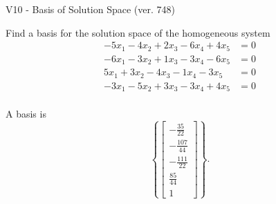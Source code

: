 \begin{exercise}
  \begin{exerciseTitle}V10 - Basis of Solution Space (ver. 748)\end{exerciseTitle}
  \begin{exerciseStatement}
    Find a basis for the solution space of the homogeneous system 
\begin{align*}
 -5 x_ 1 -4 x_ 2 + 2 x_ 3 -6 x_ 4 + 4 x_ 5 &= 0  \\ 
  -6 x_ 1 -3 x_ 2 + 1 x_ 3 -3 x_ 4 -6 x_ 5 &= 0  \\ 
  5 x_ 1 + 3 x_ 2 -4 x_ 3 -1 x_ 4 -3 x_ 5 &= 0  \\ 
  -3 x_ 1 -5 x_ 2 + 3 x_ 3 -3 x_ 4 + 4 x_ 5 &= 0  \\ 
 \end{align*}


 
  \end{exerciseStatement}

  \begin{exerciseAnswer}
   A basis is   
\[\left\{\left[\begin{array}{c}
-\frac{35}{22} \\
-\frac{107}{44} \\
-\frac{111}{22} \\
\frac{85}{44} \\
1
\end{array}\right]\right\}.\]

  


  \end{exerciseAnswer}
\end{exercise}